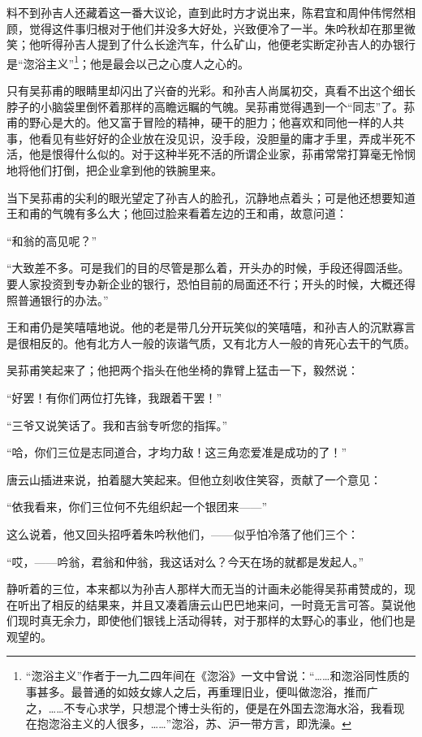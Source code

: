 \par 料不到孙吉人还藏着这一番大议论，直到此时方才说出来，陈君宜和周仲伟愕然相顾，觉得这件事归根对于他们并没多大好处，兴致便冷了一半。朱吟秋却在那里微笑；他听得孙吉人提到了什么长途汽车，什么矿山，他便老实断定孙吉人的办银行是“淴浴主义”\footnote{“淴浴主义”作者于一九二四年间在《淴浴》一文中曾说：“……和淴浴同性质的事甚多。最普通的如妓女嫁人之后，再重理旧业，便叫做淴浴，推而广之，……不专心求学，只想混个博士头衔的，便是在外国去淴海水浴，我看现在抱淴浴主义的人很多，……”淴浴，苏、沪一带方言，即洗澡。}；他是最会以己之心度人之心的。
\par 只有吴荪甫的眼睛里却闪出了兴奋的光彩。和孙吉人尚属初交，真看不出这个细长脖子的小脑袋里倒怀着那样的高瞻远瞩的气魄。吴荪甫觉得遇到一个“同志”了。荪甫的野心是大的。他又富于冒险的精神，硬干的胆力；他喜欢和同他一样的人共事，他看见有些好好的企业放在没见识，没手段，没胆量的庸才手里，弄成半死不活，他是恨得什么似的。对于这种半死不活的所谓企业家，荪甫常常打算毫无怜悯地将他们打倒，把企业拿到他的铁腕里来。
\par 当下吴荪甫的尖利的眼光望定了孙吉人的脸孔，沉静地点着头；可是他还想要知道王和甫的气魄有多么大；他回过脸来看着左边的王和甫，故意问道：
\par “和翁的高见呢？”
\par “大致差不多。可是我们的目的尽管是那么着，开头办的时候，手段还得圆活些。要人家投资到专办新企业的银行，恐怕目前的局面还不行；开头的时候，大概还得照普通银行的办法。”
\par 王和甫仍是笑嘻嘻地说。他的老是带几分开玩笑似的笑嘻嘻，和孙吉人的沉默寡言是很相反的。他有北方人一般的诙谐气质，又有北方人一般的肯死心去干的气质。
\par 吴荪甫笑起来了；他把两个指头在他坐椅的靠臂上猛击一下，毅然说：
\par “好罢！有你们两位打先锋，我跟着干罢！”
\par “三爷又说笑话了。我和吉翁专听您的指挥。”
\par “哈，你们三位是志同道合，才均力敌！这三角恋爱准是成功的了！”
\par 唐云山插进来说，拍着腿大笑起来。但他立刻收住笑容，贡献了一个意见：
\par “依我看来，你们三位何不先组织起一个银团来——”
\par 这么说着，他又回头招呼着朱吟秋他们，——似乎怕冷落了他们三个：
\par “哎，——吟翁，君翁和仲翁，我这话对么？今天在场的就都是发起人。”
\par 静听着的三位，本来都以为孙吉人那样大而无当的计画未必能得吴荪甫赞成的，现在听出了相反的结果来，并且又凑着唐云山巴巴地来问，一时竟无言可答。莫说他们现时真无余力，即使他们银钱上活动得转，对于那样的太野心的事业，他们也是观望的。
